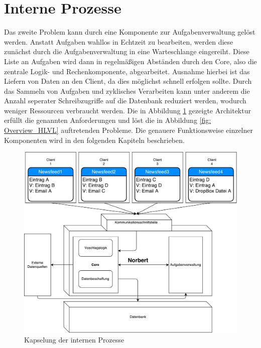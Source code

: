 \section{Interne Prozesse}

Das zweite Problem kann durch eine Komponente zur Aufgabenverwaltung gelöst werden. Anstatt Aufgaben wahllos in Echtzeit zu bearbeiten, werden diese zunächst durch die Aufgabenverwaltung in eine Warteschlange eingereiht. Diese Liste an Aufgaben wird dann in regelmäßigen Abständen durch den Core, also die zentrale Logik- und Rechenkomponente, abgearbeitet. Ausnahme hierbei ist das Liefern von Daten an den Client, da dies möglichst schnell erfolgen sollte. Durch das Sammeln von Aufgaben und zyklisches Verarbeiten kann unter anderem die Anzahl seperater Schreibzugriffe auf die Datenbank reduziert werden, wodurch weniger Ressourcen verbraucht werden. Die in Abbildung \ref{fig: Overview_Detail} gezeigte Architektur erfüllt die genannten Anforderungen und löst die in Abbildung \ref{fig: Overview_HLVL} auftretenden Probleme. Die genauere Funktionsweise einzelner Komponenten wird in den folgenden Kapiteln beschrieben.

\begin{figure}[H]
\centering
\includegraphics[scale=0.6]{uml-diagramms/overview_detail.pdf}
\caption{Kapselung der internen Prozesse}
\label{fig: Overview_Detail}
\end{figure}




        
